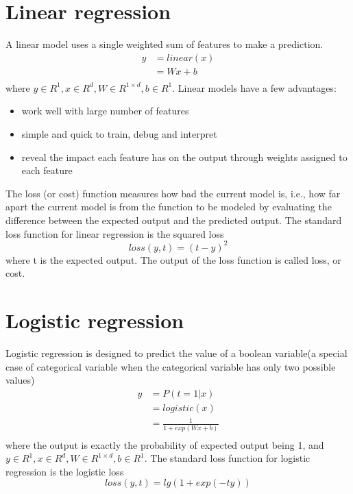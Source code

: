 \section{Linear regression}
A linear model uses a single weighted sum of features to make a prediction.
\begin{align*}
	y
	&= linear(x) \\
	&= Wx + b \\
\end{align*}
where $ y \in R^1, x \in R^d, W \in R^{1 \times d}, b \in R^1 $.
Linear models have a few advantages:
\begin{itemize}
	\item work well with large number of features
	\item simple and quick to train, debug and interpret
	\item reveal the impact each feature has on the output through weights assigned to each feature
\end{itemize}
The loss (or cost) function measures how bad the current model is, i.e., how far apart the current model is from the function to be modeled by evaluating the difference between the expected output and the predicted output.
The standard loss function for linear regression is the squared loss
\[loss(y, t) = (t - y)^2 \]
where t is the expected output.
The output of the loss function is called loss, or cost.

\section{Logistic regression}
Logistic regression is designed to predict the value of a boolean variable(a special case of categorical variable when the categorical variable has only two possible values)
\begin{align*}
	y
	&= P(t = 1 | x) \\
	&= logistic(x) \\
	&= \frac{1}{1 + exp(Wx+b)}\\
\end{align*}
where the output is exactly the probability of expected output being 1, and $ y \in R^1, x \in R^d, W \in R^{1 \times d}, b \in R^1 $.
The standard loss function for logistic regression is the logistic loss
\[ loss(y, t) = lg(1 + exp(-ty)) \]

